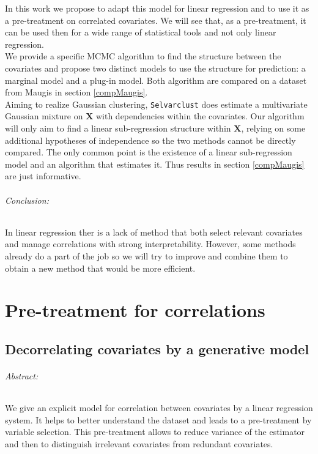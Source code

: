 \documentclass[12pt,a4paper]{report}
\begin{document}
			In this work we propose to adapt this model for linear regression and to use it as a pre-treatment on correlated covariates. We will see that, as a pre-treatment, it can be used then for a wide range of statistical tools and not only linear regression.\\
			We provide a specific MCMC algorithm to find the structure between the covariates and propose two distinct models to use the structure for prediction: a marginal model and a plug-in model. Both algorithm are compared on a dataset from Maugis in section \ref{compMaugis}.	\\
			
			Aiming to realize Gaussian clustering, {\tt Selvarclust} does estimate a multivariate Gaussian mixture on $\boldsymbol{X}$ with dependencies within the covariates. Our algorithm will only aim to find a linear sub-regression structure within $\boldsymbol{X}$, relying on some additional hypotheses of independence so the two methods cannot be directly compared. The only common point is the existence of a linear sub-regression model and an algorithm that estimates it. Thus results in section \ref{compMaugis} are just informative.
	
\paragraph{Conclusion:} In linear regression ther is a lack of method that both select relevant covariates and manage correlations with strong interpretability. However, some methods already do a part of the job so we will try to improve and combine them to obtain a new method that would be more efficient. 	
			
\part{Pre-treatment for correlations}
\chapter{Decorrelating covariates by a generative model}\label{chapexpl}
\paragraph{Abstract:} 
We give an explicit model for correlation between covariates by a linear regression system. It helps to better understand the dataset and leads to a pre-treatment by variable selection. This pre-treatment allows to reduce variance of the estimator and then to distinguish irrelevant covariates from redundant covariates.
\\
\end{document}
